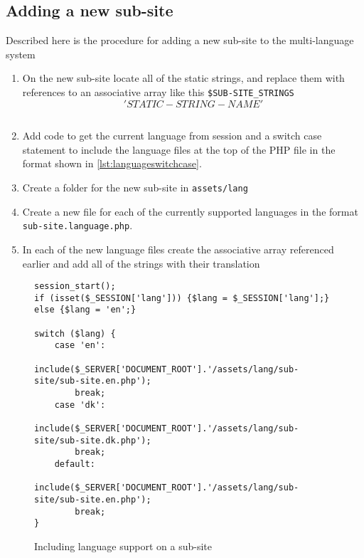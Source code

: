 \subsection{Adding a new sub-site}
Described here is the procedure for adding a new sub-site to the multi-language system
\begin{enumerate}
\item On the new sub-site locate all of the static strings, and replace them with references to an associative array like this \texttt{\$SUB-SITE\_STRINGS\['STATIC-STRING-NAME'\] }
\item Add code to get the current language from session and a switch case statement to include the language files at the top of the PHP file in the format shown in \autoref{lst:languageswitchcase}.
\item Create a folder for the new sub-site in \texttt{assets/lang}
\item Create a new file for each of the currently supported languages in the format \texttt{sub-site.language.php}.
\item In each of the new language files create the associative array referenced earlier and add all of the strings with their translation
\end{enumerate}
\begin{figure}[htbp]
\begin{lstlisting}
session_start();
if (isset($_SESSION['lang'])) {$lang = $_SESSION['lang'];} else {$lang = 'en';}

switch ($lang) {
	case 'en':
		include($_SERVER['DOCUMENT_ROOT'].'/assets/lang/sub-site/sub-site.en.php');
		break;
	case 'dk':
		include($_SERVER['DOCUMENT_ROOT'].'/assets/lang/sub-site/sub-site.dk.php');
		break;
	default:
		include($_SERVER['DOCUMENT_ROOT'].'/assets/lang/sub-site/sub-site.en.php');
		break;
}
\end{lstlisting}
\caption{Including language support on a sub-site}
\label{lst:languageswitchcase}
\end{figure}